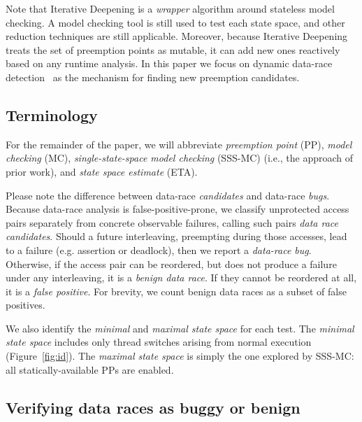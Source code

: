Note that Iterative Deepening is a {\em wrapper} algorithm around stateless model checking.
A model checking tool is still used to test each state space, and other reduction techniques are still applicable.
Moreover, because Iterative Deepening treats the set of preemption points as mutable,
it can add new ones reactively based on any runtime analysis.
In this paper we focus on dynamic data-race detection~\cite{tsan} as the mechanism for finding new preemption candidates.

\subsection{Terminology}

For the remainder of the paper, we will abbreviate {\em preemption point} (PP),
{\em model checking} (MC),
{\em single-state-space model checking} (SSS-MC) (i.e., the approach of prior work),
and {\em state space estimate} (ETA).

Please note the difference between data-race {\em candidates} and data-race {\em bugs}.
Because data-race analysis is false-positive-prone,
we classify unprotected access pairs separately from concrete observable failures, %
calling such pairs {\em data race candidates}.
Should a future interleaving, preempting during those accesses,
lead to a failure (e.g. assertion or deadlock), then we report a {\em data-race bug}.
Otherwise, if the access pair can be reordered, but does not produce a failure under any interleaving, it is a {\em benign data race}.
If they cannot be reordered at all, it is a {\em false positive}.
For brevity, we count benign data races as a subset of false positives.

We also identify the {\em minimal} and {\em maximal state space} for each test.
The {\em minimal state space} includes only thread switches arising from normal execution (Figure~\ref{fig:id}).
The {\em maximal state space} is simply the one explored by SSS-MC: all statically-available PPs are enabled.

\subsection{Verifying data races as buggy or benign} %

